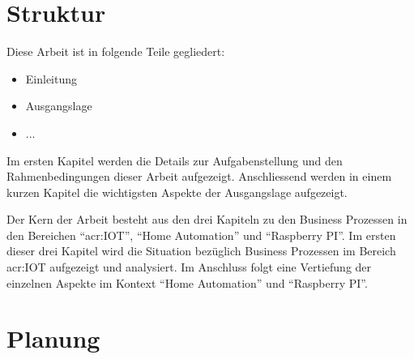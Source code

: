 \section{Struktur}
Diese Arbeit ist in folgende Teile gegliedert:

\begin{itemize}
\item Einleitung
\item Ausgangslage
\item ...
\end{itemize}

Im ersten Kapitel werden die Details zur Aufgabenstellung und den Rahmenbedingungen dieser Arbeit aufgezeigt. Anschliessend werden in einem kurzen Kapitel die wichtigsten Aspekte der Ausgangslage aufgezeigt.

Der Kern der Arbeit besteht aus den drei Kapiteln zu den Business Prozessen in den Bereichen "`\gls{acr:IOT}"', "`Home Automation"' und "`Raspberry PI"'. Im ersten dieser drei Kapitel wird die Situation bezüglich Business Prozessen im Bereich \gls{acr:IOT} aufgezeigt und analysiert. Im Anschluss folgt eine Vertiefung der einzelnen Aspekte im Kontext "`Home Automation"' und "`Raspberry PI"'.


\section{Planung} \label{sec:Intro:Planning}
